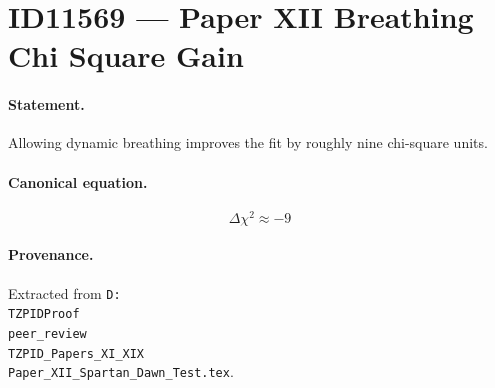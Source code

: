 \section*{ID11569 --- Paper XII Breathing Chi Square Gain}

\paragraph{Statement.}
Allowing dynamic breathing improves the fit by roughly nine chi-square units.

\paragraph{Canonical equation.}
\[
\Delta\chi^2\approx-9
\]

\paragraph{Provenance.}
Extracted from \texttt{D:\\TZPIDProof\\peer\_review\\TZPID\_Papers\_XI\_XIX\\Paper\_XII\_Spartan\_Dawn\_Test.tex}.
